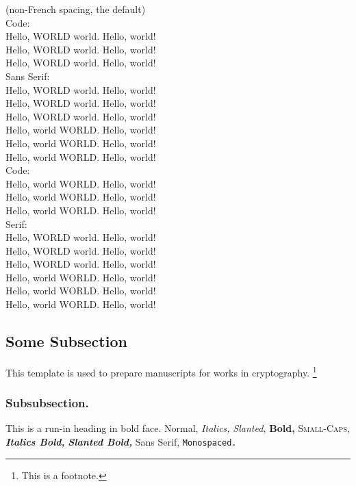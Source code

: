 \nonfrenchspacing
(non-French spacing, the default)\\
{\ttfamily
Code:\\
Hello, WORLD world. Hello, world!\\
Hello, WORLD world\willstop. Hello, world!\\
Hello, WORLD world\wontstop. Hello, world!\\
{\sffamily
Sans Serif:\\
Hello, WORLD world. Hello, world!\\
Hello, WORLD world\willstop. Hello, world!\\
Hello, WORLD world\wontstop. Hello, world!\\
Hello, world WORLD. Hello, world!\\
Hello, world WORLD\willstop. Hello, world!\\
Hello, world WORLD\wontstop. Hello, world!\\
}%
Code:\\
Hello, world WORLD. Hello, world!\\
Hello, world WORLD\willstop. Hello, world!\\
Hello, world WORLD\wontstop. Hello, world!\\
}%
Serif:\\
Hello, WORLD world. Hello, world!\\
Hello, WORLD world\willstop. Hello, world!\\
Hello, WORLD world\wontstop. Hello, world!\\
Hello, world WORLD. Hello, world!\\
Hello, world WORLD\willstop. Hello, world!\\
Hello, world WORLD\wontstop. Hello, world!

\subsection{Some Subsection}

This template is used to prepare manuscripts for works in cryptography.%
\footnote{This is a footnote.}

\subsubsection{Subsubsection.}
This is a run-in heading in bold face.
Normal,
\textit{Italics,}
\textsl{Slanted,}
\textbf{Bold,}
\textsc{Small-Caps,}
\textit{\textbf{Italics Bold,}}
\textsl{\textbf{Slanted Bold,}}
\textsf{Sans Serif,}
\texttt{Monospaced.}

